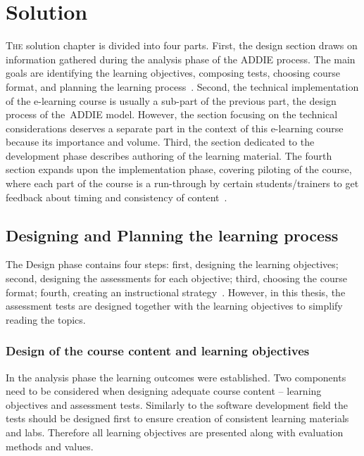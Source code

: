 \chapter{Solution}
\label{solution}
\lettrine[lraise=0.1, nindent=0em, slope=-.5em]{\color{Violet}T}{he} solution chapter is divided into four parts. First, the design section draws on information gathered during the analysis phase of the  \gls{ADDIE} process. The main goals are identifying the learning objectives, composing tests, choosing course format, and planning the learning process~\citep{website:design_phase_ADDIE}.  Second, the technical implementation of the e-learning course is usually a sub-part of the previous part, the design process of the~\gls{ADDIE}  model. However, the section focusing on the technical considerations deserves a separate part in the context of this e-learning course because its importance and  volume. Third, the section dedicated to the development phase describes authoring of the learning material. The fourth section expands upon the implementation phase, covering piloting of the course, where each part of the course is a run-through by certain students/trainers to get feedback about timing and consistency of content~\citep{website:design_phase_ADDIE}.



 
\section{Designing and Planning the learning process}
The Design phase contains four steps: first, designing the learning objectives; second, designing the assessments for each objective; third, choosing the course format; fourth, creating an instructional strategy~\citep{website:design_phase_ADDIE}.  However, in this thesis, the assessment tests are designed together with the learning objectives to simplify reading the topics.

\subsection{Design of the course content and learning objectives}

In the analysis phase the learning outcomes were established. Two components need to be considered when designing adequate course content -- learning objectives and assessment tests. Similarly to the software development field the tests should be designed first to ensure creation of consistent learning materials and labs. Therefore all learning objectives are presented along with evaluation methods and values.

